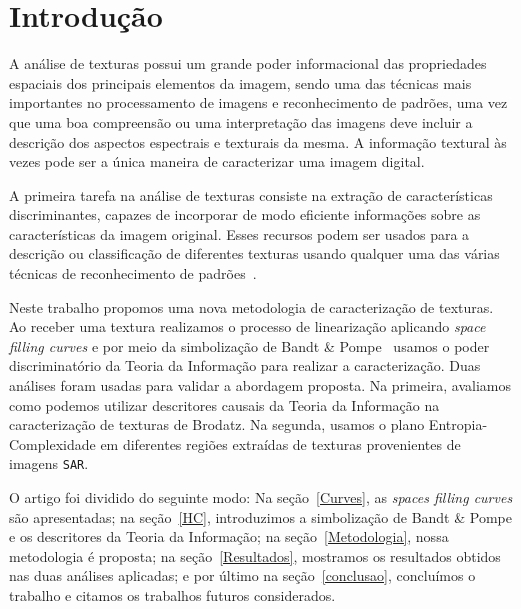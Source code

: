 \documentclass[remotesensing,article,submit,moreauthors,pdftex,10pt,a4paper]{Definitions/mdpi}
\begin{document}
	
	
	
	\section{Introdução}
	
	A análise de texturas possui um grande poder informacional das propriedades espaciais dos principais elementos da imagem, sendo uma das técnicas mais importantes no processamento de imagens e reconhecimento de padrões, uma vez que uma boa compreensão ou uma interpretação das imagens deve incluir a descrição dos aspectos espectrais e texturais da mesma. 
	A informação textural às vezes pode ser a única maneira de caracterizar uma imagem digital.
	
	A primeira tarefa na análise de texturas consiste na extração de características discriminantes, capazes de incorporar de modo eficiente informações sobre as características da imagem original.
	Esses recursos podem ser usados para a descrição ou classificação de diferentes texturas usando qualquer uma das várias técnicas de reconhecimento de padrões~\cite{Lee1994Texture}.
	
	Neste trabalho propomos uma nova metodologia de caracterização de texturas. 
	Ao receber uma textura realizamos o processo de linearização aplicando \textit{space filling curves} e por meio da simbolização de Bandt \& Pompe~\cite{Bandt2002Permutation} usamos o poder discriminatório da Teoria da Informação para realizar a caracterização.
	Duas análises foram usadas para validar a abordagem proposta.
	Na primeira, avaliamos como podemos utilizar descritores causais da Teoria da Informação na caracterização de texturas de Brodatz. 
	Na segunda, usamos o plano Entropia-Complexidade em diferentes regiões extraídas de texturas provenientes de imagens \texttt{SAR}.
	
	O artigo foi dividido do seguinte modo: Na seção~\ref{Curves}, as \textit{spaces filling curves} são apresentadas; na seção~\ref{HC}, introduzimos a simbolização de Bandt \& Pompe e os descritores da Teoria da Informação; na seção~\ref{Metodologia}, nossa metodologia é proposta; na seção~\ref{Resultados}, mostramos os resultados obtidos nas duas análises aplicadas; e por último na seção~\ref{conclusao}, concluímos o trabalho e citamos os trabalhos futuros considerados. 
	
\end{document}
